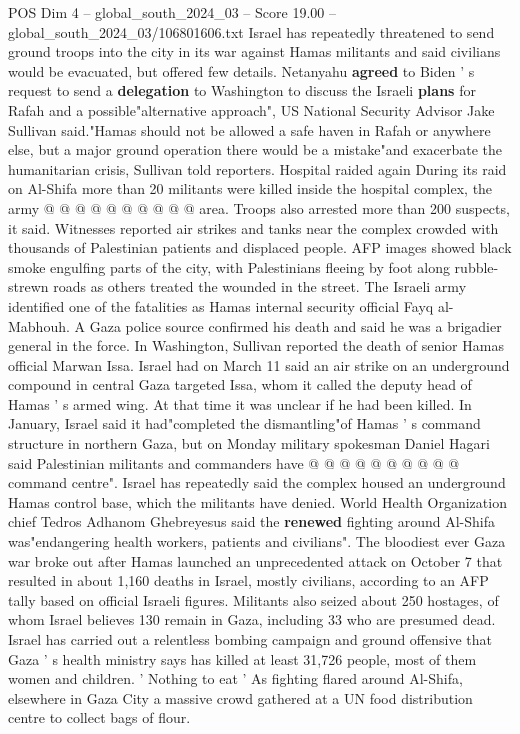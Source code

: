 \begin{textsample}{POS Dim 4 – global\_south\_2024\_03 – Score 19.00 – global\_south\_2024\_03/106801606.txt}
Israel has repeatedly threatened to send ground troops into the city in its war against Hamas militants and said civilians would be evacuated, but offered few details.
Netanyahu \textbf{agreed} to Biden ' s request to send a \textbf{delegation} to Washington to discuss the Israeli \textbf{plans} for Rafah and a possible"alternative approach", US National Security Advisor Jake Sullivan said."Hamas should not be allowed a safe haven in Rafah or anywhere else, but a major ground operation there would be a mistake"and exacerbate the humanitarian crisis, Sullivan told reporters.
Hospital raided again During its raid on Al-Shifa more than 20 militants were killed inside the hospital complex, the army @ @ @ @ @ @ @ @ @ @ area.
Troops also arrested more than 200 suspects, it said.
Witnesses reported air strikes and tanks near the complex crowded with thousands of Palestinian patients and displaced people.
AFP images showed black smoke engulfing parts of the city, with Palestinians fleeing by foot along rubble-strewn roads as others treated the wounded in the street.
The Israeli army identified one of the fatalities as Hamas internal security official Fayq al-Mabhouh.
A Gaza police source confirmed his death and said he was a brigadier general in the force.
In Washington, Sullivan reported the death of senior Hamas official Marwan Issa.
Israel had on March 11 said an air strike on an underground compound in central Gaza targeted Issa, whom it called the deputy head of Hamas ' s armed wing.
At that time it was unclear if he had been killed.
In January, Israel said it had"completed the dismantling"of Hamas ' s command structure in northern Gaza, but on Monday military spokesman Daniel Hagari said Palestinian militants and commanders have @ @ @ @ @ @ @ @ @ @ command centre".
Israel has repeatedly said the complex housed an underground Hamas control base, which the militants have denied.
World Health Organization chief Tedros Adhanom Ghebreyesus said the \textbf{renewed} fighting around Al-Shifa was"endangering health workers, patients and civilians".
The bloodiest ever Gaza war broke out after Hamas launched an unprecedented attack on October 7 that resulted in about 1,160 deaths in Israel, mostly civilians, according to an AFP tally based on official Israeli figures.
Militants also seized about 250 hostages, of whom Israel believes 130 remain in Gaza, including 33 who are presumed dead.
Israel has carried out a relentless bombing campaign and ground offensive that Gaza ' s health ministry says has killed at least 31,726 people, most of them women and children. ' Nothing to eat ' As fighting flared around Al-Shifa, elsewhere in Gaza City a massive crowd gathered at a UN food distribution centre to collect bags of flour.

\end{textsample}
